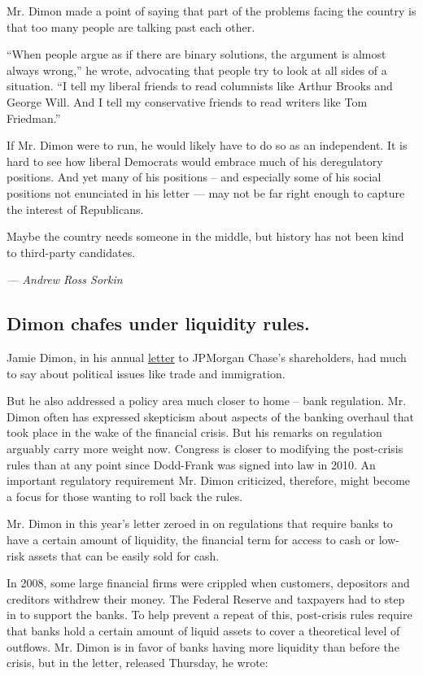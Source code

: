 Mr. Dimon made a point of saying that part of the problems facing the
country is that too many people are talking past each other.

``When people argue as if there are binary solutions, the argument is
almost always wrong,'' he wrote, advocating that people try to look at
all sides of a situation. ``I tell my liberal friends to read columnists
like Arthur Brooks and George Will. And I tell my conservative friends
to read writers like Tom Friedman.''

If Mr. Dimon were to run, he would likely have to do so as an
independent. It is hard to see how liberal Democrats would embrace much
of his deregulatory positions. And yet many of his positions -- and
especially some of his social positions not enunciated in his letter ---
may not be far right enough to capture the interest of Republicans.

Maybe the country needs someone in the middle, but history has not been
kind to third-party candidates.

\emph{--- Andrew Ross Sorkin}

\hypertarget{dimon-chafes-under-liquidity-rules}{%
\subsection{Dimon chafes under liquidity
rules.}\label{dimon-chafes-under-liquidity-rules}}

Jamie Dimon, in his annual
\href{https://www.jpmorganchase.com/corporate/investor-relations/document/ceo-letter-to-shareholders-2017.pdf}{letter}
to JPMorgan Chase's shareholders, had much to say about political issues
like trade and immigration.

But he also addressed a policy area much closer to home -- bank
regulation. Mr. Dimon often has expressed skepticism about aspects of
the banking overhaul that took place in the wake of the financial
crisis. But his remarks on regulation arguably carry more weight now.
Congress is closer to modifying the post-crisis rules than at any point
since Dodd-Frank was signed into law in 2010. An important regulatory
requirement Mr. Dimon criticized, therefore, might become a focus for
those wanting to roll back the rules.

Mr. Dimon in this year's letter zeroed in on regulations that require
banks to have a certain amount of liquidity, the financial term for
access to cash or low-risk assets that can be easily sold for cash.

In 2008, some large financial firms were crippled when customers,
depositors and creditors withdrew their money. The Federal Reserve and
taxpayers had to step in to support the banks. To help prevent a repeat
of this, post-crisis rules require that banks hold a certain amount of
liquid assets to cover a theoretical level of outflows. Mr. Dimon is in
favor of banks having more liquidity than before the crisis, but in the
letter, released Thursday, he wrote:

